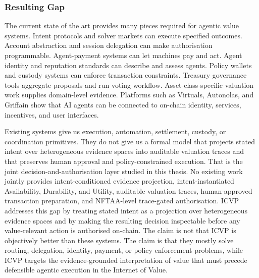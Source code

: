 \subsubsection{Resulting Gap}

The current state of the art provides many pieces required for agentic value
systems. Intent protocols and solver markets can execute specified outcomes.
Account abstraction and session delegation can make authorisation programmable.
Agent-payment systems can let machines pay and act. Agent identity and
reputation standards can describe and assess agents. Policy wallets and custody
systems can enforce transaction constraints. Treasury governance tools aggregate
proposals and run voting workflow. Asset-class-specific valuation work supplies
domain-level evidence. Platforms such as Virtuals, Autonolas, and Griffain show
that AI agents can be connected to on-chain identity, services, incentives, and
user interfaces.

Existing systems give us execution, automation, settlement, custody, or
coordination primitives. They do not give us a formal model that projects
stated intent over heterogeneous evidence spaces into auditable valuation
traces and that preserves human approval and policy-constrained execution.
That is the joint decision-and-authorisation layer studied in this thesis.
No existing work jointly provides intent-conditioned evidence projection,
intent-instantiated Availability, Durability, and Utility, auditable
valuation traces, human-approved transaction preparation, and NFTAA-level
trace-gated authorisation. ICVP addresses this gap by treating stated intent as
a projection over heterogeneous evidence spaces and by making the resulting
decision inspectable before any value-relevant action is authorised on-chain. The
claim is not that ICVP is objectively better than these systems. The claim is
that they mostly solve routing, delegation, identity, payment, or policy
enforcement problems, while ICVP targets the evidence-grounded interpretation of
value that must precede defensible agentic execution in the Internet of Value.
